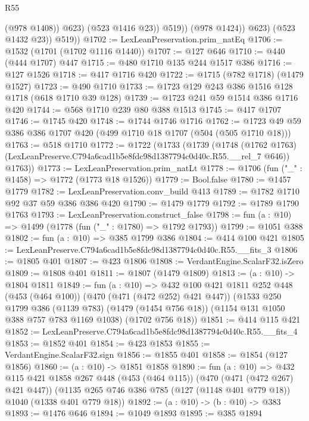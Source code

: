 \begin{lexlean}{R55}
\begin{coremodule}
                        (@978 @1408))
                      @623)
                    (@523 @1416 @23))
                  @519))
              (@978 @1424))
            @623)
          (@523 @1432 @23))
        @519))
@1702 := LexLeanPreservation.prim_natEq
@1706 := @1532 (@1701 (@1702 @1116 @1440))
@1707 := @127 @646
@1710 := @440 (@444 @1707) @447
@1715 := @480 @1710 @135 @244 @1517 @386
@1716 := @127 @1526
@1718 := @417 @1716 @420
@1722 := @1715 (@782 @1718) (@1479 @1527)
@1723 := @490 @1710
@1733 := @1723 @129 @243 @386 @1516 @128 @1718 (@618 @1710 @39 @128)
@1739 := @1723 @241 @59 @1514 @386 @1716 @420
@1744 := @568 @1710 @239 @80 @388 @1513
@1745 := @417 @1707
@1746 := @1745 @420
@1748 := @1744 @1746 @1716
@1762 := @1723 @49 @59 @386 @386 @1707 @420 (@499 @1710 @18 @1707 (@504 (@505 @1710 @18)))
@1763 := @518 @1710
@1772 := @1722
    (@1733
      (@1739
        (@1748 (@1762 @1763) (LexLeanPreserve.C794a6cad1b5e8fdc98d1387794c0d40c.R55.__rel_7 @646))
        @1763))
@1773 := LexLeanPreservation.prim_natLt
@1778 := @1706 (fun ("_" : @1458) => @1772 (@1773 @18 @1526))
@1779 := Bool.false
@1780 := @1457 @1779
@1782 := LexLeanPreservation.conv_build @413
@1789 := @1782 @1710 @92 @37 @59 @386 @386 @420
@1790 := @1479 @1779
@1792 := @1789 @1790 @1763
@1793 := LexLeanPreservation.construct_false
@1798 := fun (a : @10) => @1499 (@1778 (fun ("_" : @1780) => @1792 @1793))
@1799 := @1051 @388
@1802 := fun (a : @10) => @385 @1799 @386
@1804 := @414 @100 @421
@1805 := LexLeanPreserve.C794a6cad1b5e8fdc98d1387794c0d40c.R55.__fits_3
@1806 := @1805 @401
@1807 := @423 @1806
@1808 := VerdantEngine.ScalarF32.isZero
@1809 := @1808 @401
@1811 := @1807 (@1479 @1809)
@1813 := (a : @10) -> @1804 @1811
@1849 := fun (a : @10) =>
  @432
    @100
    @421
    @1811
    @252
    @448
    (@453 (@464 @100))
    (@470 (@471 (@472 @252) @421 @447))
    (@1533
      @250
      @1799
      @386
      (@1139 @783)
      (@1479 (@1454 @756 @18))
      (@1154 @131 @1050 @388 @757 @783 @1169 @1038)
      (@1702 @756 @18))
@1851 := @414 @115 @421
@1852 := LexLeanPreserve.C794a6cad1b5e8fdc98d1387794c0d40c.R55.__fits_4
@1853 := @1852 @401
@1854 := @423 @1853
@1855 := VerdantEngine.ScalarF32.sign
@1856 := @1855 @401
@1858 := @1854 (@127 @1856)
@1860 := (a : @10) -> @1851 @1858
@1890 := fun (a : @10) =>
  @432
    @115
    @421
    @1858
    @267
    @448
    (@453 (@464 @115))
    (@470 (@471 (@472 @267) @421 @447))
    (@1135 @265 @746 @386 @785 (@127 (@1148 @401 @779 @18)) @1040 (@1338 @401 @779 @18))
@1892 := (a : @10) -> (b : @10) -> @383
@1893 := @1476 @646
@1894 := @1049 @1893
@1895 := @385 @1894

\end{coremodule}
\end{lexlean}
